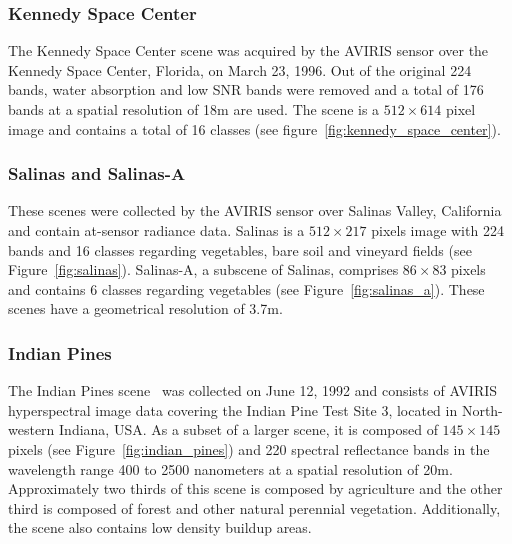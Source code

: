 \documentclass[preprint,12pt]{elsarticle}
\begin{document}
\subsubsection*{Kennedy Space Center}

The Kennedy Space Center scene was acquired by the AVIRIS sensor over the
Kennedy Space Center, Florida, on March 23, 1996. Out of the original 224
bands, water absorption and low SNR bands were removed and a total of 176
bands at a spatial resolution of 18m are used. The scene is a $512 \times 614$
pixel image and contains a total of 16 classes (see
figure~\ref{fig:kennedy_space_center}).

\subsubsection*{Salinas and Salinas-A}

These scenes were collected by the AVIRIS sensor over Salinas Valley,
California and contain at-sensor radiance data. Salinas is a $512 \times 217$
pixels image with 224 bands and 16 classes regarding vegetables, bare soil and
vineyard fields (see Figure~\ref{fig:salinas}). Salinas-A, a subscene of
Salinas, comprises $86 \times 83$ pixels and contains 6 classes regarding
vegetables (see Figure~\ref{fig:salinas_a}). These scenes have a geometrical
resolution of 3.7m.

\subsubsection*{Indian Pines} 

The Indian Pines scene~\cite{Baumgardner2015} was collected on June 12, 1992
and consists of AVIRIS hyperspectral image data covering the Indian Pine Test
Site 3, located in North-western Indiana, USA. As a subset of a larger scene,
it is composed of $145 \times 145$ pixels (see Figure~\ref{fig:indian_pines})
and 220 spectral reflectance bands in the wavelength range 400 to 2500
nanometers at a spatial resolution of 20m. Approximately two thirds of
this scene is composed by agriculture and the other third is composed of
forest and other natural perennial vegetation. Additionally, the scene also
contains low density buildup areas.
\end{document}
